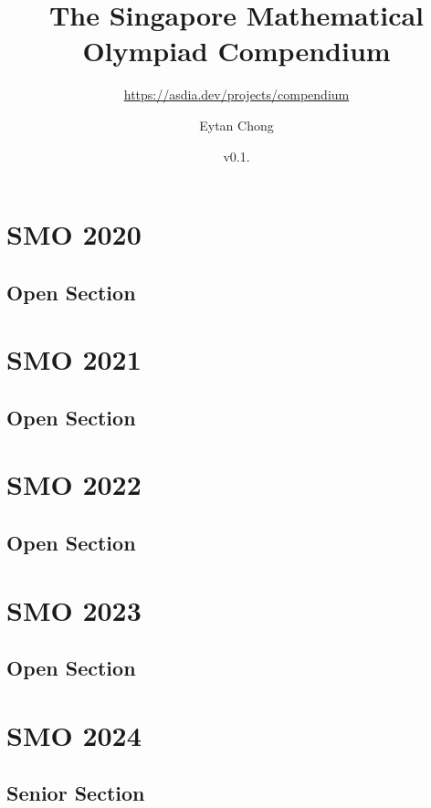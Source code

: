 \documentclass[a4paper,listof=totoc,bibliography=totoc,openany]{scrbook}
\title{The Singapore Mathematical Olympiad Compendium}
\subtitle{\url{https://asdia.dev/projects/compendium}}
\author{Eytan Chong}
\date{v0.1.\datetwo}
\begin{document}
\maketitle

\frontmatter

\tableofcontents



\mainmatter


\chapter{SMO 2020}
\section{Open Section}


\chapter{SMO 2021}
\section{Open Section}


\chapter{SMO 2022}
\section{Open Section}



\chapter{SMO 2023}
\section{Open Section}



\chapter{SMO 2024}
\section{Senior Section}


\end{document}
